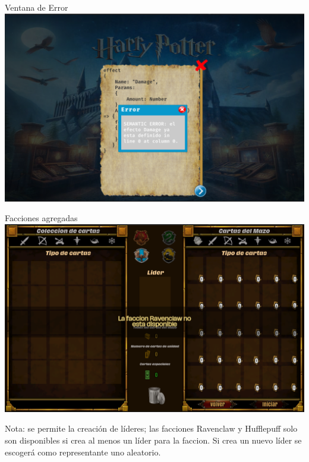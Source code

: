 \documentclass[a4paper, 12pt]{beamer}
\begin{document}
\begin{frame}{\textcolor{plata}{Ventana de Error}}
\includegraphics[scale = 0.2]{images/image13.png}
\end{frame}

\begin{frame}{\textcolor{plata}{Facciones agregadas}}
\includegraphics[scale = 0.2]{images/image14.png}\\
\begin{tiny}
Nota: se permite la creación de líderes; las facciones Ravenclaw y Hufflepuff solo son disponibles si crea al menos un líder para la faccion. Si crea un nuevo líder se escogerá como representante uno aleatorio.
\end{tiny} 
\end{frame}
\end{document}
